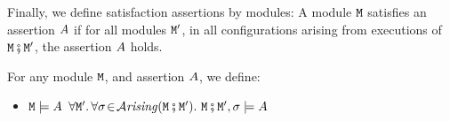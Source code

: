 %
%

Finally, we define satisfaction assertions by modules: A module $\M$ satisfies an assertion $\A$ if for all modules $\M'$, in all configurations arising from executions of $\M\mkpair\M'$, the assertion $\A$ holds.

\begin{definition}
\label{def:module_satisfies}
For any module $\M$, and  assertion $\A$, we define:
\begin{itemize}
\item
$\M \models \A$ \IFF  $\forall \M'.\, \forall \sigma\!\in\!\Arising{\M\mkpair\M'}.\   \M\mkpair\M', \sigma \models \A$
\end{itemize}
\end{definition}

